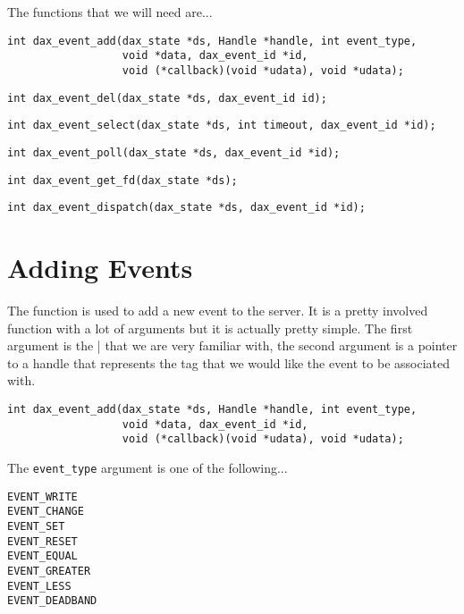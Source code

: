 The functions that we will need are...

\begin{verbatim}
int dax_event_add(dax_state *ds, Handle *handle, int event_type,
                  void *data, dax_event_id *id, 
                  void (*callback)(void *udata), void *udata);
\end{verbatim}
\begin{verbatim}
int dax_event_del(dax_state *ds, dax_event_id id);
\end{verbatim}
\begin{verbatim}
int dax_event_select(dax_state *ds, int timeout, dax_event_id *id);
\end{verbatim}
\begin{verbatim}
int dax_event_poll(dax_state *ds, dax_event_id *id);
\end{verbatim}
\begin{verbatim}
int dax_event_get_fd(dax_state *ds);
\end{verbatim}
\begin{verbatim}
int dax_event_dispatch(dax_state *ds, dax_event_id *id);
\end{verbatim}

\section{Adding Events}

The \eventadd{} function is used to add a new event to the server.  It is a pretty involved function with a lot of arguments but it is actually pretty simple.  The first argument is the \daxstate| that we are very familiar with, the second argument is a pointer to a handle that represents the tag that we would like the event to be associated with.

\begin{verbatim}
int dax_event_add(dax_state *ds, Handle *handle, int event_type,
                  void *data, dax_event_id *id, 
                  void (*callback)(void *udata), void *udata);
\end{verbatim}

The \texttt{event\_type} argument is one of the following... 

\begin{verbatim}
EVENT_WRITE
EVENT_CHANGE
EVENT_SET
EVENT_RESET
EVENT_EQUAL
EVENT_GREATER
EVENT_LESS
EVENT_DEADBAND
\end{verbatim}

